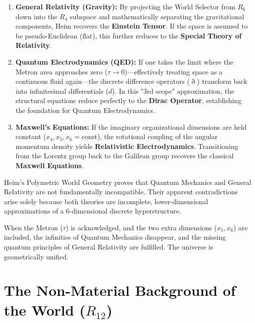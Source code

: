 \documentclass[11pt,a4paper,oneside]{article}
\newcommand{\ethop}{\eth}
\begin{document}
\begin{enumerate}
    \item \textbf{General Relativity (Gravity):}
    By projecting the World Selector from $R_6$ down into the $R_4$ subspace and mathematically separating the gravitational components, Heim recovers the \textbf{Einstein Tensor}. If the space is assumed to be pseudo-Euclidean (flat), this further reduces to the \textbf{Special Theory of Relativity}.
    
    \item \textbf{Quantum Electrodynamics (QED):}
    If one takes the limit where the Metron area approaches zero ($\tau \to 0$)—effectively treating space as a continuous fluid again—the discrete difference operators ($\ethop$) transform back into infinitesimal differentials ($d$). In this "3rd scope" approximation, the structural equations reduce perfectly to the \textbf{Dirac Operator}, establishing the foundation for Quantum Electrodynamics.
    
    \item \textbf{Maxwell's Equations:}
    If the imaginary organizational dimensions are held constant ($x_4, x_5, x_6 = \text{const}$), the rotational coupling of the angular momentum density yields \textbf{Relativistic Electrodynamics}. Transitioning from the Lorentz group back to the Galilean group recovers the classical \textbf{Maxwell Equations}.
\end{enumerate}

\begin{tcolorbox}[colback=white, colframe=theoryblue, title=\textbf{Conclusion of the Polymetric Architecture}]
Heim's Polymetric World Geometry proves that Quantum Mechanics and General Relativity are not fundamentally incompatible. Their apparent contradictions arise solely because both theories are incomplete, lower-dimensional approximations of a 6-dimensional discrete hyperstructure. 

When the Metron ($\tau$) is acknowledged, and the two extra dimensions ($x_5, x_6$) are included, the infinities of Quantum Mechanics disappear, and the missing quantum principles of General Relativity are fulfilled. The universe is geometrically unified.
\end{tcolorbox}

\section{The Non-Material Background of the World (\texorpdfstring{$R_{12}$}{R12})}
\label{sec:r12_background}
\end{document}
